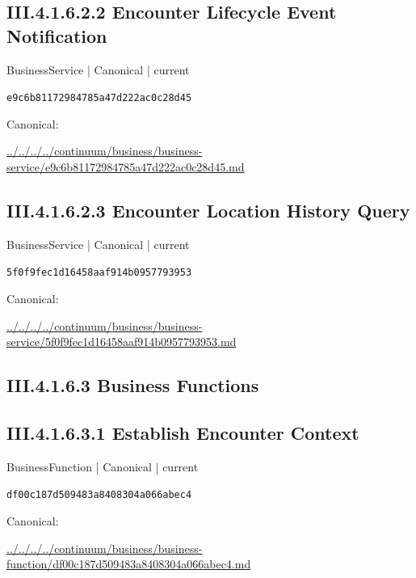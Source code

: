 \documentclass[10pt,a4paper]{article}
\begin{document}
\subsection*{III.4.1.6.2.2 Encounter Lifecycle Event Notification}
\label{element-e9c6b81172984785a47d222ac0c28d45}
{\small BusinessService | Canonical | current}\par
\texttt{e9c6b81172984785a47d222ac0c28d45}\par
Canonical: \par
{\footnotesize\url{../../../../continuum/business/business-service/e9c6b81172984785a47d222ac0c28d45.md}}\par
\subsection*{III.4.1.6.2.3 Encounter Location History Query}
\label{element-5f0f9fec1d16458aaf914b0957793953}
{\small BusinessService | Canonical | current}\par
\texttt{5f0f9fec1d16458aaf914b0957793953}\par
Canonical: \par
{\footnotesize\url{../../../../continuum/business/business-service/5f0f9fec1d16458aaf914b0957793953.md}}\par
\subsection*{III.4.1.6.3 Business Functions}
\subsection*{III.4.1.6.3.1 Establish Encounter Context}
\label{element-df00c187d509483a8408304a066abec4}
{\small BusinessFunction | Canonical | current}\par
\texttt{df00c187d509483a8408304a066abec4}\par
Canonical: \par
{\footnotesize\url{../../../../continuum/business/business-function/df00c187d509483a8408304a066abec4.md}}\par
\end{document}
